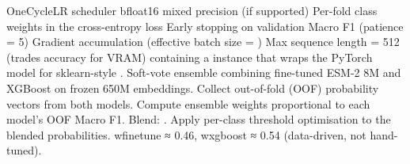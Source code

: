 \markdownRendererUlItem OneCycleLR scheduler\markdownRendererUlItemEnd 
\markdownRendererUlItem bfloat16 mixed precision (if supported)\markdownRendererUlItemEnd 
\markdownRendererUlItem Per-fold class weights in the cross-entropy loss\markdownRendererUlItemEnd 
\markdownRendererUlItem Early stopping on validation Macro F1 (patience = 5)\markdownRendererUlItemEnd 
\markdownRendererUlItem Gradient accumulation (effective batch size = )\markdownRendererUlItemEnd 
\markdownRendererUlItem Max sequence length = 512 (trades accuracy for VRAM)\markdownRendererUlItemEnd 
\markdownRendererUlEndTight \markdownRendererInterblockSeparator
{}  containing a \markdownRendererSoftLineBreak
{}instance that wraps the PyTorch model for sklearn-style .\markdownRendererInterblockSeparator
{}\markdownRendererThematicBreak{}\markdownRendererInterblockSeparator
{}
\markdownRendererSectionEnd \markdownRendererSectionBegin
{}\markdownRendererInterblockSeparator
{} Soft-vote ensemble combining fine-tuned ESM-2 8M and XGBoost on frozen 650M\markdownRendererSoftLineBreak
{}embeddings.\markdownRendererParagraphSeparator
{}\markdownRendererInterblockSeparator
{}\markdownRendererOlBeginTight
{}Collect out-of-fold (OOF) probability vectors from both models.\markdownRendererOlItemEnd 
{}Compute ensemble weights proportional to each model's OOF Macro F1.\markdownRendererOlItemEnd 
{}Blend: .\markdownRendererOlItemEnd 
{}Apply per-class threshold optimisation to the blended probabilities.\markdownRendererOlItemEnd 
\markdownRendererOlEndTight \markdownRendererInterblockSeparator
{} w\markdownRendererUnderscore{}finetune ≈ 0.46, w\markdownRendererUnderscore{}xgboost ≈ 0.54 (data-driven, not hand-tuned).\markdownRendererParagraphSeparator
